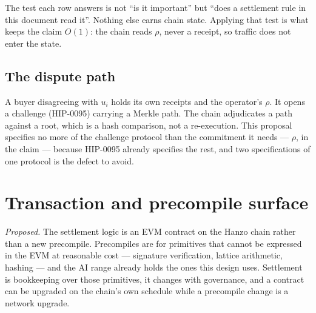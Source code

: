 \documentclass[11pt,a4paper]{article}
\begin{document}
The test each row answers is not ``is it important'' but ``does a settlement rule
in this document read it''. Nothing else earns chain state. Applying that test is
what keeps the claim $O(1)$: the chain reads $\rho$, never a receipt, so traffic
does not enter the state.

\subsection{The dispute path}

A buyer disagreeing with $u_i$ holds its own receipts and the operator's $\rho$.
It opens a challenge (HIP-0095) carrying a Merkle path. The chain adjudicates a
path against a root, which is a hash comparison, not a re-execution. This
proposal specifies no more of the challenge protocol than the commitment it needs
--- $\rho$, in the claim --- because HIP-0095 already specifies the rest, and two
specifications of one protocol is the defect to avoid.

\section{Transaction and precompile surface}

\emph{Proposed.} The settlement logic is an EVM contract on the Hanzo chain
rather than a new precompile. Precompiles are for primitives that cannot be
expressed in the EVM at reasonable cost --- signature verification, lattice
arithmetic, hashing --- and the AI range already holds the ones this design uses.
Settlement is bookkeeping over those primitives, it changes with governance, and
a contract can be upgraded on the chain's own schedule while a precompile change
is a network upgrade.
\end{document}
